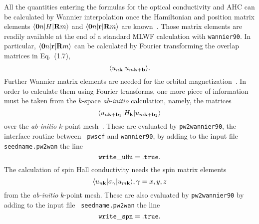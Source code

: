 All the quantities entering the formulas for the optical conductivity
and AHC can be calculated by Wannier interpolation once the
Hamiltonian and position matrix elements $\langle {\bf 0}n\vert H\vert
{\bf R}m\rangle$ and $\langle {\bf 0}n\vert {\bf r}\vert {\bf
  R}m\rangle$ are known~\cite{wang-prb06,yates-prb07}.  Those matrix
elements are readily available at the end of a standard MLWF
calculation with {\tt wannier90}. In particular, $\langle {\bf
  0}n\vert {\bf r}\vert {\bf R}m\rangle$ can be calculated by Fourier
transforming the overlap matrices in Eq.~(1.7),
%
$$\langle u_{n{\bf k}}\vert u_{m{\bf k}+{\bf b}}\rangle.
$$
%
Further Wannier matrix elements are needed for the orbital
magnetization~\cite{lopez-prb12}. In order to calculate them using
Fourier transforms, one more piece of information must be taken from
the $k$-space {\it ab-initio} calculation, namely, the matrices
%
$$\langle u_{n{\bf k}+{\bf b}_1}\vert
H_{\bf k}\vert u_{m{\bf k}+{\bf b}_2}\rangle
$$
%
over the {\it ab-initio} $k$-point mesh~\cite{lopez-prb12}.  These are
evaluated by {\tt pw2wannier90}, the interface routine between {\tt
  pwscf} and {\tt wannier90}, by adding to the input file {\tt
  seedname.pw2wan} the line
%
$${\tt
write\_uHu = .true.
}
$$
The calculation of spin Hall conductivity needs the 
spin matrix elements
%
$$\langle u_{n{\bf k}}\vert \sigma_\gamma \vert u_{m{\bf k}}\rangle, 
\gamma = x, y, z
$$
% 
from the {\it ab-initio} $k$-point mesh. These are also 
evaluated by {\tt pw2wannier90} by adding to the input file {\tt
seedname.pw2wan} the line
%
$${\tt
	write\_spn = .true.
}
$$
 


